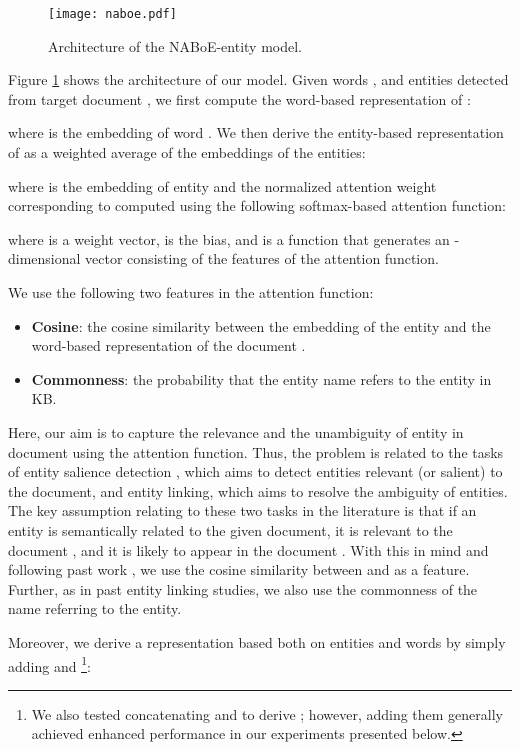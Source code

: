 \documentclass[11pt,a4paper]{article}
\begin{document}
    \begin{figure}[t]
        \centering
        \texttt{[image: naboe.pdf]}
        \caption{Architecture of the NABoE-entity model.}
        \label{fig:architecture}
\end{figure}

    Figure \ref{fig:architecture} shows the architecture of our model.
    Given words , and entities  detected from target document , we first compute the word-based representation of :
    
    where  is the embedding of word .
    We then derive the entity-based representation of  as a weighted average of the embeddings of the entities:
    
    where  is the embedding of entity  and  the normalized attention weight corresponding to  computed using the following softmax-based attention function:
    
    where  is a weight vector,  is the bias, and  is a function that generates an -dimensional vector consisting of the features of the attention function.

    We use the following two features in the attention function:
    \begin{itemize}
        \item \textbf{Cosine}: the cosine similarity between the embedding of the entity  and the word-based representation of the document .
        \item \textbf{Commonness}: the probability that the entity name refers to the entity in KB.
    \end{itemize}
    Here, our aim is to capture the relevance and the unambiguity of entity  in document  using the attention function.
    Thus, the problem is related to the tasks of entity salience detection \cite{Gamon2013,dunietz-gillick:2014:EACL2014-SP}, which aims to detect entities relevant (or salient) to the document, and entity linking, which aims to resolve the ambiguity of entities.
    The key assumption relating to these two tasks in the literature is that if an entity is semantically related to the given document, it is relevant to the document \cite{dunietz-gillick:2014:EACL2014-SP}, and it is likely to appear in the document \cite{Milne2008,Ratinov2011}.
    With this in mind and following past work \cite{Yamada2016}, we use the cosine similarity between  and  as a feature.
    Further, as in past entity linking studies, we also use the commonness of the name referring to the entity.

    Moreover, we derive a representation based both on entities and words by simply adding  and \footnote{We also tested concatenating  and  to derive ; however, adding them generally achieved enhanced performance in our experiments presented below.}:
    
\end{document}
